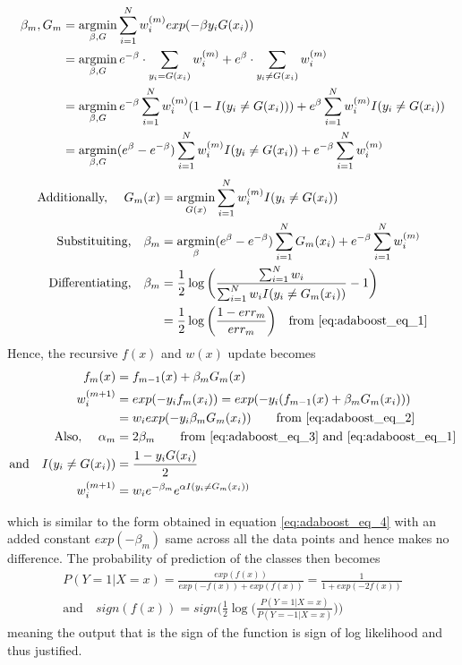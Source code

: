 \documentclass[../statistical_learning_notes.tex]{subfiles}
\begin{document}
    \begin{align*}
        \beta_{m}, G_{m} &= \operatorname*{argmin}_{\beta, G} \sum_{i=1}^{N} w_{i}^{(m)} exp(-\beta y_{i} G(x_{i}))\\
        &= \operatorname*{argmin}_{\beta, G} e^{-\beta} \cdot \sum_{y_{i} = G(x_{i})} w_{i}^{(m)} + e^{\beta}  \cdot\sum_{y_{i} \neq G(x_{i})} w_{i}^{(m)}\\
        &= \operatorname*{argmin}_{\beta, G} e^{-\beta} \sum_{i=1}^{N} w_{i}^{(m)} (1 - I(y_{i} \neq G(x_{i}))) + e^{\beta} \sum_{i=1}^{N} w_{i}^{(m)} I(y_{i} \neq G(x_{i}))\\
        &= \operatorname*{argmin}_{\beta, G} (e^{\beta} - e^{-\beta}) \sum_{i=1}^{N} w_{i}^{(m)} I(y_{i} \neq G(x_{i})) + e^{-\beta} \sum_{i=1}^{N} w_{i}^{(m)}
    \end{align*}
    \begin{align*}
        \text{Additionally, } \quad G_{m}(x) &= \operatorname*{argmin}_{G(x)} \sum_{i=1}^{N} w_{i}^{(m)} I(y_{i} \neq G(x_{i}))\\
        \text{Substituiting,}\quad \beta_{m} &= \operatorname*{argmin}_{\beta} (e^{\beta} - e^{-\beta}) \sum_{i=1}^{N} G_{m}(x_{i}) + e^{-\beta} \sum_{i=1}^{N} w_{i}^{(m)}\\
        \text{Differentiating,} \quad \beta_{m} &= \frac{1}{2}\log \bigg( \frac{\sum_{i=1}^{N}w_{i}}{\sum_{i=1}^{N}w_{i}I(y_{i} \neq G_{m}(x_{i}))} - 1 \bigg)\\
        &= \frac{1}{2} \log \bigg( \frac{1 - err_{m}}{err_{m}} \bigg) \quad \text{from \eqref{eq:adaboost_eq_1}}
    \end{align*}
    Hence, the recursive $f(x)$ and $w(x)$ update becomes
    \begin{align*}
        f_{m}(x) &= f_{m-1}(x) + \beta_{m} G_{m}(x)\\
        w_{i}^{(m+1)} &= exp(-y_{i} f_{m}(x_{i})) =  exp(-y_{i} (f_{m-1}(x) + \beta_{m} G_{m}(x_{i})))\\
        &= w_{i} exp(-y_{i}\beta_{m}G_{m}(x_{i})) \tag*{from \eqref{eq:adaboost_eq_2}}\\
        \text{Also, } \quad \alpha_{m} &= 2\beta_{m} \tag*{from \eqref{eq:adaboost_eq_3} and \eqref{eq:adaboost_eq_1}}\\
        \text{and} \quad I(y_{i} \neq G(x_{i})) &= \frac{1 - y_{i}G(x_{i})}{2}\\
        w_{i}^{(m+1)} &= w_{i} e^{-\beta_{m}} e^{\alpha I(y_{i} \neq G_{m}(x_{i}))}
    \end{align*}

    which is similar to the form obtained in equation \eqref{eq:adaboost_eq_4} with an added constant $exp(-\beta_{m})$ same across all the data points and hence makes no difference. The probability of prediction of the classes then becomes
    \begin{gather*}
        P(Y=1|X=x) = \frac{exp(f(x))}{exp(-f(x)) + exp(f(x))} = \frac{1}{1+exp(-2f(x))}\\
        \text{and} \quad sign(f(x)) = sign \bigg(\frac{1}{2}\log \bigg(\frac{P(Y=1|X=x)}{P(Y=-1|X=x)} \bigg)\bigg)
    \end{gather*}
    meaning the output that is the sign of the function is sign of log likelihood and thus justified.
\end{document}
